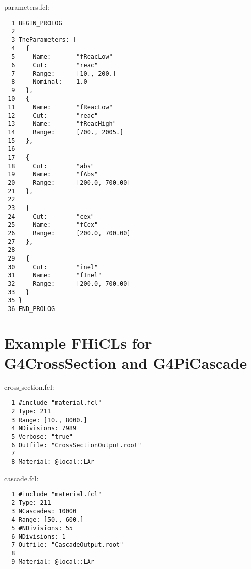 \documentclass[12pt]{article}
\begin{document}
parameters.fcl:
\begin{lstlisting}
  1 BEGIN_PROLOG
  2 
  3 TheParameters: [                          
  4   {                                       
  5     Name:       "fReacLow"                
  6     Cut:        "reac"                    
  7     Range:      [10., 200.]               
  8     Nominal:    1.0                       
  9   },                                      
 10   {                                       
 11     Name:       "fReacLow"                
 12     Cut:        "reac"                    
 13     Name:       "fReacHigh"               
 14     Range:      [700., 2005.]             
 15   },                                      
 16                                           
 17   {                                       
 18     Cut:        "abs"                     
 19     Name:       "fAbs"                    
 20     Range:      [200.0, 700.00]           
 21   },                                      
 22                                           
 23   {                                       
 24     Cut:        "cex"                     
 25     Name:       "fCex"                    
 26     Range:      [200.0, 700.00]           
 27   },                                      
 28                                           
 29   {                                       
 30     Cut:        "inel"                    
 31     Name:       "fInel"                   
 32     Range:      [200.0, 700.00]           
 33   }
 35 }
 36 END_PROLOG
\end{lstlisting}

\newpage

\section{Example FHiCLs for G4CrossSection and G4PiCascade}\label{app:Prediction_FHICL}
cross$\_$section.fcl:
\begin{lstlisting}
  1 #include "material.fcl"
  2 Type: 211
  3 Range: [10., 8000.]
  4 NDivisions: 7989
  5 Verbose: "true"
  6 Outfile: "CrossSectionOutput.root"
  7 
  8 Material: @local::LAr
\end{lstlisting}

cascade.fcl:
\begin{lstlisting}
  1 #include "material.fcl"
  2 Type: 211
  3 NCascades: 10000
  4 Range: [50., 600.]
  5 #NDivisions: 55
  6 NDivisions: 1
  7 Outfile: "CascadeOutput.root"
  8 
  9 Material: @local::LAr
\end{lstlisting}
\end{document}
